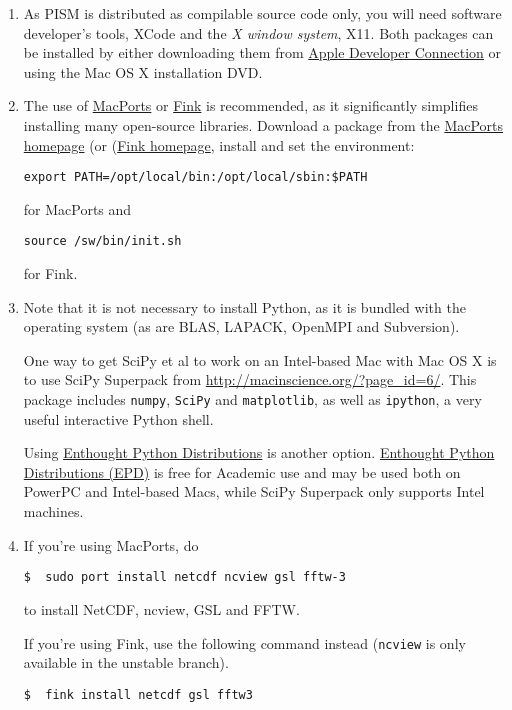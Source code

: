\documentclass[11pt,final]{amsart}
\begin{document}
\begin{enumerate}
\item As PISM is distributed as compilable source code only, you will need software developer's tools, XCode and the \emph{X
    window system}, X11. Both packages can be installed by either downloading them from
  \href{http://developer.apple.com/tools/xcode/}{Apple Developer Connection} or using the Mac OS X installation DVD.
\item The use of \href{http://www.macports.org/}{MacPorts} or \href{http://www.finkproject.org/}{Fink} is recommended, as it significantly simplifies installing many
  open-source libraries. Download a package from the \href{http://www.macports.org/install.php}{MacPorts homepage} (or
  (\href{http://www.finkproject.org/download/index.php}{Fink homepage}, install and set the environment:

\begin{verbatim}
export PATH=/opt/local/bin:/opt/local/sbin:$PATH
\end{verbatim}
for MacPorts and
\begin{verbatim}
source /sw/bin/init.sh
\end{verbatim}
for Fink.

\item Note that it is not necessary to install Python, as it is bundled with the operating system (as are BLAS, LAPACK, OpenMPI
  and Subversion).

  One way to get SciPy et al to work on an Intel-based Mac with Mac OS X is to use SciPy Superpack from
  \url{http://macinscience.org/?page_id=6/}. This package includes \texttt{numpy}, \texttt{SciPy} and \texttt{matplotlib}, as well
  as \texttt{ipython}, a very useful interactive Python shell.

  
  Using \href{http://www.enthought.com/}{Enthought Python Distributions} is another option.
  \href{http://www.enthought.com/}{Enthought Python Distributions (EPD)} is free for Academic use and may be used both on PowerPC and
  Intel-based Macs, while SciPy Superpack only supports Intel machines.

\item  If you're using MacPorts, do
\begin{verbatim}
$  sudo port install netcdf ncview gsl fftw-3
\end{verbatim}%
to install NetCDF, ncview, GSL and FFTW.

If you're using Fink, use the following command instead (\texttt{ncview} is only available in the unstable branch).
\begin{verbatim}
$  fink install netcdf gsl fftw3
\end{verbatim}


\end{enumerate}
\end{document}
